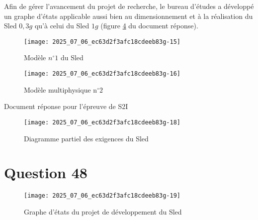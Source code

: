 \ifprof
\else
Afin de gérer l'avancement du projet de recherche, le bureau d'études a développé un graphe d'états applicable aussi bien au dimensionnement et à la réalisation du Sled $0,3 g$ qu'à celui du Sled $1 g$ (figure \ref{ccs_mp_2022_fig_B} du document réponse).
\fi

\ifprof
\begin{corrige}
\end{corrige}
\else
\fi

\ifprof
\else

\begin{figure}[!h]
\centering

\texttt{[image: 2025\_07\_06\_ec63d2f3afc18cdeeb83g-15]}
\caption{\label{ccs_mp_2022_fig_20}Modèle $n^{\circ} 1$ du Sled}
\end{figure}


\begin{figure}[!h]
\centering
\texttt{[image: 2025\_07\_06\_ec63d2f3afc18cdeeb83g-16]}

\caption{\label{ccs_mp_2022_fig_21}Modèle multiphysique $\mathrm{n}^{\circ} 2$}
\end{figure}

\fi



\ifprof
\else
Document réponse pour l'épreuve de S2I\\

\begin{figure}[!h]
\centering
\texttt{[image: 2025\_07\_06\_ec63d2f3afc18cdeeb83g-18]}

\caption{\label{ccs_mp_2022_fig_A}Diagramme partiel des exigences du Sled}
\end{figure}

\section*{Question 48}
\begin{figure}[!h]
\centering

\texttt{[image: 2025\_07\_06\_ec63d2f3afc18cdeeb83g-19]}

\caption{\label{ccs_mp_2022_fig_B}Graphe d'états du projet de développement du Sled}
\end{figure}

\fi
